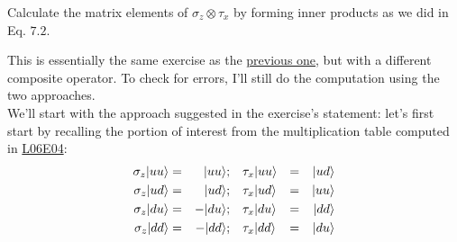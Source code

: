 \documentclass[solutions.tex]{subfiles}
\begin{document}
\maketitle
\begin{exercise} Calculate the matrix elements of $\sigma_z\otimes\tau_x$
by forming inner products as we did in Eq. $7.2$.
\end{exercise}
This is essentially the same exercise as the
\href{https://github.com/mbivert/ttm/blob/master/qm/L07E01.pdf}{previous one},
but with a different composite operator. To check for errors, I'll still
do the computation using the two approaches. \\

We'll start with the approach suggested in the exercise's statement: let's
first start by recalling the portion of interest from the multiplication table
computed in
\href{https://github.com/mbivert/ttm/blob/master/qm/L06E04.pdf}{L06E04}:
\begin{equation*}\begin{aligned}
	\sigma_z|uu\rangle &=&|uu\rangle;  &&& \tau_x|uu\rangle &=&& |ud\rangle \\
	\sigma_z|ud\rangle &=&|ud\rangle;  &&& \tau_x|ud\rangle &=&& |uu\rangle \\
	\sigma_z|du\rangle &=&-|du\rangle; &&& \tau_x|du\rangle &=&& |dd\rangle \\
	\sigma_z|dd\rangle &=&-|dd\rangle; &&& \tau_x|dd\rangle &=&& |du\rangle \\
\end{aligned}\end{equation*}
\end{document}
